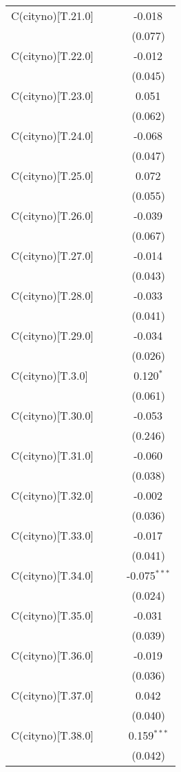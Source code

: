 \begin{table}[!htbp]
\begin{tabular}{@{\extracolsep{5pt}}lccc}
 C(cityno)[T.21.0] & & & -0.018$^{}$ \\
& & & (0.077) \\
 C(cityno)[T.22.0] & & & -0.012$^{}$ \\
& & & (0.045) \\
 C(cityno)[T.23.0] & & & 0.051$^{}$ \\
& & & (0.062) \\
 C(cityno)[T.24.0] & & & -0.068$^{}$ \\
& & & (0.047) \\
 C(cityno)[T.25.0] & & & 0.072$^{}$ \\
& & & (0.055) \\
 C(cityno)[T.26.0] & & & -0.039$^{}$ \\
& & & (0.067) \\
 C(cityno)[T.27.0] & & & -0.014$^{}$ \\
& & & (0.043) \\
 C(cityno)[T.28.0] & & & -0.033$^{}$ \\
& & & (0.041) \\
 C(cityno)[T.29.0] & & & -0.034$^{}$ \\
& & & (0.026) \\
 C(cityno)[T.3.0] & & & 0.120$^{*}$ \\
& & & (0.061) \\
 C(cityno)[T.30.0] & & & -0.053$^{}$ \\
& & & (0.246) \\
 C(cityno)[T.31.0] & & & -0.060$^{}$ \\
& & & (0.038) \\
 C(cityno)[T.32.0] & & & -0.002$^{}$ \\
& & & (0.036) \\
 C(cityno)[T.33.0] & & & -0.017$^{}$ \\
& & & (0.041) \\
 C(cityno)[T.34.0] & & & -0.075$^{***}$ \\
& & & (0.024) \\
 C(cityno)[T.35.0] & & & -0.031$^{}$ \\
& & & (0.039) \\
 C(cityno)[T.36.0] & & & -0.019$^{}$ \\
& & & (0.036) \\
 C(cityno)[T.37.0] & & & 0.042$^{}$ \\
& & & (0.040) \\
 C(cityno)[T.38.0] & & & 0.159$^{***}$ \\
& & & (0.042) \\

\end{tabular}
\end{table}
